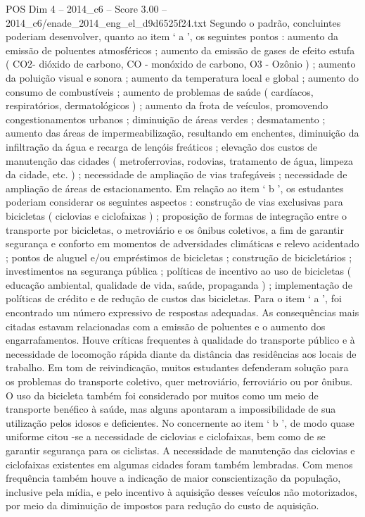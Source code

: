 \begin{textsample}{POS Dim 4 – 2014\_c6 – Score 3.00 – 2014\_c6/enade\_2014\_eng\_el\_d9d6525f24.txt}
Segundo o padrão, concluintes poderiam desenvolver, quanto ao item ‘ a ’, os seguintes pontos : aumento da emissão de poluentes atmosféricos ; aumento da emissão de gases de efeito estufa ( CO2- dióxido de carbono, CO - monóxido de carbono, O3 - Ozônio ) ; aumento da poluição visual e sonora ; aumento da temperatura local e global ; aumento do consumo de combustíveis ; aumento de problemas de saúde ( cardíacos, respiratórios, dermatológicos ) ; aumento da frota de veículos, promovendo congestionamentos urbanos ; diminuição de áreas verdes ; desmatamento ; aumento das áreas de impermeabilização, resultando em enchentes, diminuição da infiltração da água e recarga de lençóis freáticos ; elevação dos custos de manutenção das cidades ( metroferrovias, rodovias, tratamento de água, limpeza da cidade, etc. ) ; necessidade de ampliação de vias trafegáveis ; necessidade de ampliação de áreas de estacionamento.
Em relação ao item ‘ b ’, os estudantes poderiam considerar os seguintes aspectos : construção de vias exclusivas para bicicletas ( ciclovias e ciclofaixas ) ; proposição de formas de integração entre o transporte por bicicletas, o metroviário e os ônibus coletivos, a fim de garantir segurança e conforto em momentos de adversidades climáticas e relevo acidentado ; pontos de aluguel e/ou empréstimos de bicicletas ; construção de bicicletários ; investimentos na segurança pública ; políticas de incentivo ao uso de bicicletas ( educação ambiental, qualidade de vida, saúde, propaganda ) ; implementação de políticas de crédito e de redução de custos das bicicletas.
Para o item ‘ a ’, foi encontrado um número expressivo de respostas adequadas.
As consequências mais citadas estavam relacionadas com a emissão de poluentes e o aumento dos engarrafamentos.
Houve críticas frequentes à qualidade do transporte público e à necessidade de locomoção rápida diante da distância das residências aos locais de trabalho.
Em tom de reivindicação, muitos estudantes defenderam solução para os problemas do transporte coletivo, quer metroviário, ferroviário ou por ônibus.
O uso da bicicleta também foi considerado por muitos como um meio de transporte benéfico à saúde, mas alguns apontaram a impossibilidade de sua utilização pelos idosos e deficientes.
No concernente ao item ‘ b ’, de modo quase uniforme citou -se a necessidade de ciclovias e ciclofaixas, bem como de se garantir segurança para os ciclistas.
A necessidade de manutenção das ciclovias e ciclofaixas existentes em algumas cidades foram também lembradas.
Com menos frequência também houve a indicação de maior conscientização da população, inclusive pela mídia, e pelo incentivo à aquisição desses veículos não motorizados, por meio da diminuição de impostos para redução do custo de aquisição.

\end{textsample}
